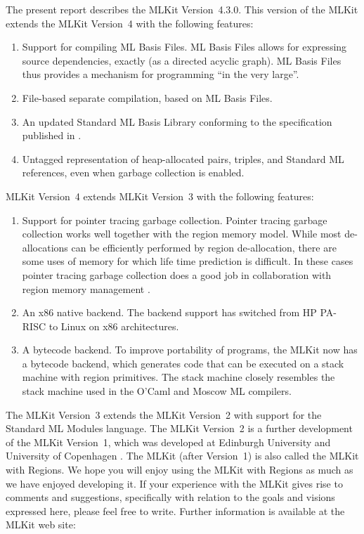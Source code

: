 \documentclass[12pt]{book}
\newcommand{\docversion}{4.3.0}
\begin{document}
The present report describes the 
\index{MLKit!Version \docversion}%
MLKit Version~{\docversion}. This version of the MLKit extends the MLKit
Version~4 with the following features:
\begin{enumerate}
\item Support for compiling 
%
ML Basis Files. ML Basis Files allows for
  expressing source dependencies, exactly (as a directed acyclic
  graph). ML Basis Files thus provides a mechanism for programming
  ``in the very large''.

\item File-based 
%
separate compilation, based on ML Basis Files.
\item An updated Standard ML Basis Library conforming to the
  specification published in \cite{basislib2004}.
\item Untagged representation of heap-allocated pairs, triples, and
  Standard ML references, even when garbage collection is enabled.
\end{enumerate}

MLKit Version~4 extends
MLKit Version~3 with the following features:
\begin{enumerate}
\item Support for pointer tracing garbage collection. Pointer tracing
  garbage collection works well together with the region memory model.
  While most de-allocations can be efficiently performed by region
  de-allocation, there are some uses of memory for which life time
  prediction is difficult. In these cases pointer tracing garbage
  collection does a good job in collaboration with region memory
  management \cite{hallenberg99,het02}.
\item An x86 native backend. The 
  backend support has switched from HP PA-RISC to Linux on x86
  architectures.
  
\item A 
  bytecode backend. To improve portability of programs, the MLKit now
  has a bytecode backend, which generates code that can be executed on
  a stack machine with region primitives. The stack machine closely
  resembles the stack machine used in the O'Caml and Moscow ML
  compilers.
\end{enumerate}

The 
%
MLKit Version~3 extends the MLKit Version~2 with support for the
Standard ML Modules language. The
%
MLKit Version~2 is a further development of the 
%
MLKit Version~1, which was developed at Edinburgh University and
University of Copenhagen \cite{brtt93}.  The MLKit (after Version~1)
is also called the MLKit with Regions.  We hope you will enjoy using
the MLKit with Regions as much as we have enjoyed developing it. If
your experience with the MLKit gives rise to comments and suggestions,
specifically with relation to the goals and visions expressed here,
please feel free to write.  Further information is available at the
MLKit
%
web site:
\begin{tabbing}
\hskip2cm
\end{tabbing}
\end{document}
